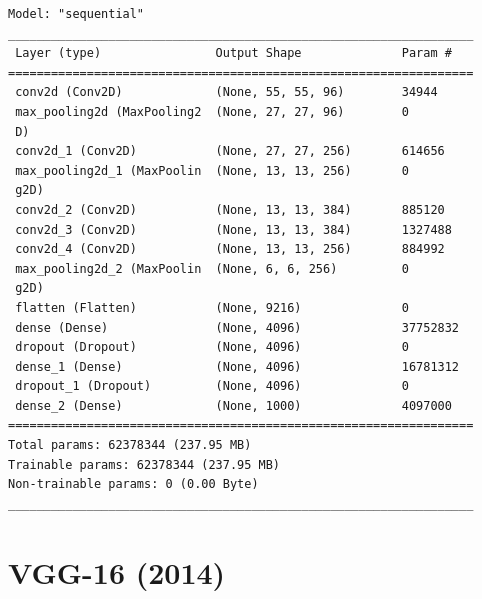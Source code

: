 \begin{lstlisting}[numbers=none]
Model: "sequential"
_________________________________________________________________
 Layer (type)                Output Shape              Param #   
=================================================================
 conv2d (Conv2D)             (None, 55, 55, 96)        34944     
 max_pooling2d (MaxPooling2  (None, 27, 27, 96)        0         
 D)                                                              
 conv2d_1 (Conv2D)           (None, 27, 27, 256)       614656    
 max_pooling2d_1 (MaxPoolin  (None, 13, 13, 256)       0         
 g2D)                                                            
 conv2d_2 (Conv2D)           (None, 13, 13, 384)       885120    
 conv2d_3 (Conv2D)           (None, 13, 13, 384)       1327488   
 conv2d_4 (Conv2D)           (None, 13, 13, 256)       884992    
 max_pooling2d_2 (MaxPoolin  (None, 6, 6, 256)         0         
 g2D)                                                            
 flatten (Flatten)           (None, 9216)              0         
 dense (Dense)               (None, 4096)              37752832  
 dropout (Dropout)           (None, 4096)              0         
 dense_1 (Dense)             (None, 4096)              16781312  
 dropout_1 (Dropout)         (None, 4096)              0         
 dense_2 (Dense)             (None, 1000)              4097000   
=================================================================
Total params: 62378344 (237.95 MB)
Trainable params: 62378344 (237.95 MB)
Non-trainable params: 0 (0.00 Byte)
_________________________________________________________________
\end{lstlisting}


\section{VGG-16 (2014) \cite{gfg-convolutional-neural-network-cnn-in-machine-learning,arxiv-1409.1556,gfg-vgg-16-cnn-model}}\label{cnn: VGG-16}


